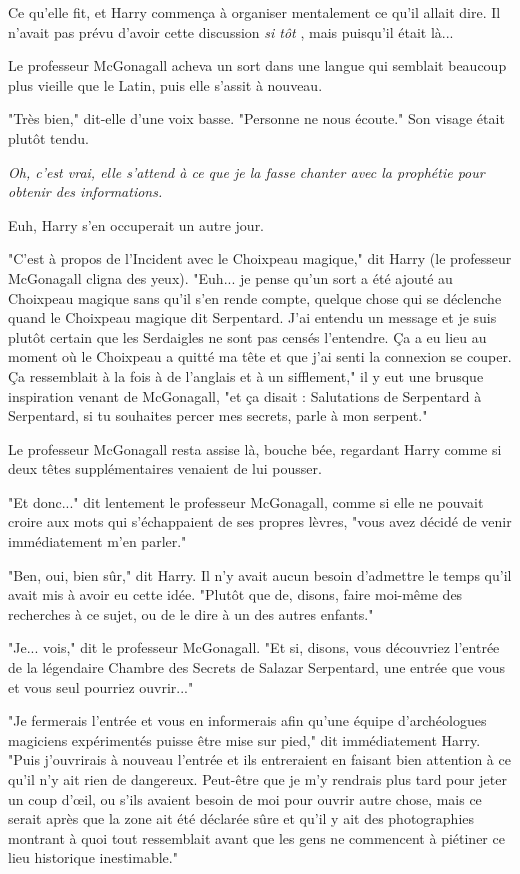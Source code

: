 Ce qu'elle fit, et Harry commença à organiser mentalement ce qu'il allait dire. Il n'avait pas prévu d'avoir cette discussion \emph{si tôt} , mais puisqu'il était là...

Le professeur McGonagall acheva un sort dans une langue qui semblait beaucoup plus vieille que le Latin, puis elle s'assit à nouveau.

"Très bien," dit-elle d'une voix basse. "Personne ne nous écoute." Son visage était plutôt tendu.

\emph{Oh, c'est vrai, elle s'attend à ce que je la fasse chanter avec la prophétie pour obtenir des informations.} 

Euh, Harry s'en occuperait un autre jour.

"C'est à propos de l'Incident avec le Choixpeau magique," dit Harry (le professeur McGonagall cligna des yeux). "Euh... je pense qu'un sort a été ajouté au Choixpeau magique sans qu'il s'en rende compte, quelque chose qui se déclenche quand le Choixpeau magique dit Serpentard. J'ai entendu un message et je suis plutôt certain que les Serdaigles ne sont pas censés l'entendre. Ça a eu lieu au moment où le Choixpeau a quitté ma tête et que j'ai senti la connexion se couper. Ça ressemblait à la fois à de l'anglais et à un sifflement," il y eut une brusque inspiration venant de McGonagall, "et ça disait : Salutations de Serpentard à Serpentard, si tu souhaites percer mes secrets, parle à mon serpent."

Le professeur McGonagall resta assise là, bouche bée, regardant Harry comme si deux têtes supplémentaires venaient de lui pousser.

"Et donc..." dit lentement le professeur McGonagall, comme si elle ne pouvait croire aux mots qui s'échappaient de ses propres lèvres, "vous avez décidé de venir immédiatement m'en parler."

"Ben, oui, bien sûr," dit Harry. Il n'y avait aucun besoin d'admettre le temps qu'il avait mis à avoir eu cette idée. "Plutôt que de, disons, faire moi-même des recherches à ce sujet, ou de le dire à un des autres enfants."

"Je... vois," dit le professeur McGonagall. "Et si, disons, vous découvriez l'entrée de la légendaire Chambre des Secrets de Salazar Serpentard, une entrée que vous et vous seul pourriez ouvrir..."

"Je fermerais l'entrée et vous en informerais afin qu'une équipe d'archéologues magiciens expérimentés puisse être mise sur pied," dit immédiatement Harry. "Puis j'ouvrirais à nouveau l'entrée et ils entreraient en faisant bien attention à ce qu'il n'y ait rien de dangereux. Peut-être que je m'y rendrais plus tard pour jeter un coup d'œil, ou s'ils avaient besoin de moi pour ouvrir autre chose, mais ce serait après que la zone ait été déclarée sûre et qu'il y ait des photographies montrant à quoi tout ressemblait avant que les gens ne commencent à piétiner ce lieu historique inestimable."

